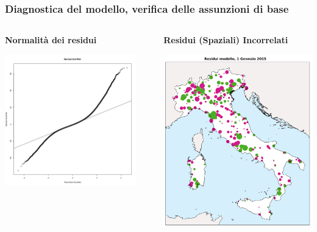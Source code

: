 \documentclass{beamer}
\begin{document}
\begin{frame}
\frametitle{Diagnostica del modello, verifica delle assunzioni di base}
\begin{columns}
\begin{column}{0.5\textwidth}
\centerline{\textbf{Normalità dei residui}}
\includegraphics[width=0.9\textwidth]{qqplot.png}
\end{column}
\begin{column}{0.5\textwidth}
\centerline{\textbf{Residui (Spaziali) Incorrelati}}
\includegraphics[height=0.9\textwidth]{residui_modello_1gennaio2015.png}
\end{column}
\end{columns}
\end{frame}
\end{document}
